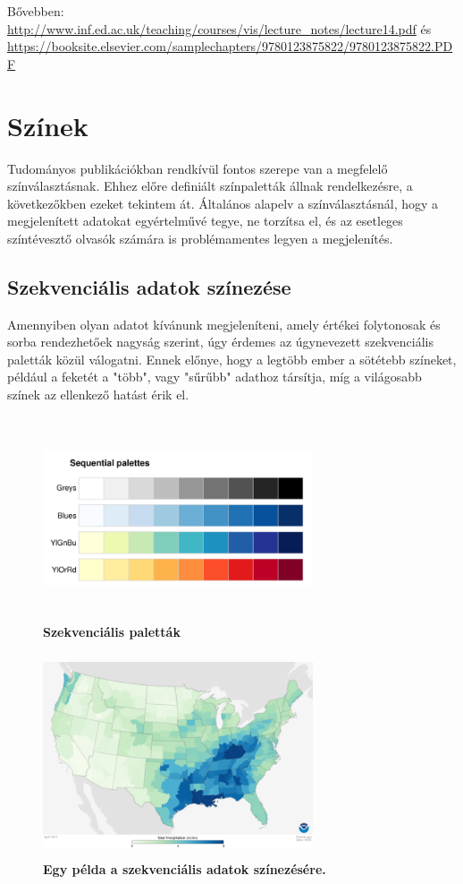 \documentclass[12pt]{article}
\theoremstyle{plain}
\begin{document}
Bővebben:
\url{http://www.inf.ed.ac.uk/teaching/courses/vis/lecture\_notes/lecture14.pdf} és  \url{https://booksite.elsevier.com/samplechapters/9780123875822/9780123875822.PDF}


\section{Színek}
Tudományos publikációkban rendkívül fontos szerepe van a megfelelő színválasztásnak. Ehhez előre definiált színpaletták állnak rendelkezésre, a következőkben ezeket tekintem át. Általános alapelv a színválasztásnál, hogy a megjelenített adatokat egyértelművé tegye, ne torzítsa el, és az esetleges színtévesztő olvasók számára is problémamentes legyen a megjelenítés.

\subsection{Szekvenciális adatok színezése}

Amennyiben olyan adatot kívánunk megjeleníteni, amely értékei folytonosak és sorba rendezhetőek nagyság szerint, úgy érdemes az úgynevezett szekvenciális paletták közül válogatni. Ennek előnye, hogy a legtöbb ember a sötétebb színeket, például a feketét a "több", vagy "sűrűbb" adathoz társítja, míg a világosabb színek az ellenkező hatást érik el. 

\begin{figure}[H]
   \centering
   \includegraphics[width=8cm, height=6cm]{media/sequential.png}
   \caption{\textbf{Szekvenciális paletták}}
   \label{fig:GeneralDiagram}
\end{figure}

\begin{figure}[H]
   \centering
   \includegraphics[width=8cm, height=6cm]{media/map.png}
   \caption{\textbf{Egy példa a szekvenciális adatok színezésére.}}
   \label{fig:GeneralDiagram}
\end{figure}
\end{document}

